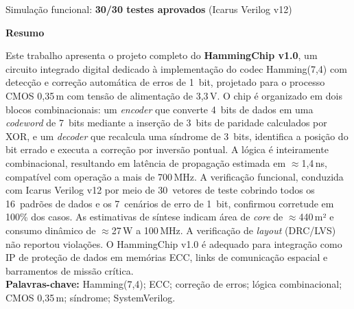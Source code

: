 \documentclass[12pt,a4paper]{article}
\begin{document}
\begin{center}

  \vfill
  {\small\textcolor{hamminggray}{Simulação funcional: \textbf{30/30 testes aprovados} (Icarus Verilog v12)}}
\end{center}

\newpage

\begin{center}
  {\large\bfseries\color{hammingblue} Resumo}
\end{center}
\begin{unidadebox}[Resumo]
Este trabalho apresenta o projeto completo do \textbf{HammingChip v1.0}, um circuito integrado digital dedicado à implementação do codec Hamming(7,4) com detecção e correção automática de erros de 1~bit, projetado para o processo CMOS 0,35\,\textmu m com tensão de alimentação de 3,3\,V. O chip é organizado em dois blocos combinacionais: um \textit{encoder} que converte 4~bits de dados em uma \textit{codeword} de 7~bits mediante a inserção de 3~bits de paridade calculados por XOR, e um \textit{decoder} que recalcula uma síndrome de 3~bits, identifica a posição do bit errado e executa a correção por inversão pontual. A lógica é inteiramente combinacional, resultando em latência de propagação estimada em $\approx$1,4\,ns, compatível com operação a mais de 700\,MHz. A verificação funcional, conduzida com Icarus Verilog v12 por meio de 30~vetores de teste cobrindo todos os 16~padrões de dados e os 7~cenários de erro de 1~bit, confirmou corretude em 100\% dos casos. As estimativas de síntese indicam área de \textit{core} de $\approx$440\,\textmu m² e consumo dinâmico de $\approx$27\,\textmu W a 100\,MHz. A verificação de \textit{layout} (DRC/LVS) não reportou violações. O HammingChip v1.0 é adequado para integração como IP de proteção de dados em memórias ECC, links de comunicação espacial e barramentos de missão crítica.\\[4pt]
\textbf{Palavras-chave:} Hamming(7,4); ECC; correção de erros; lógica combinacional; CMOS 0,35\,\textmu m; síndrome; SystemVerilog.
\end{unidadebox}
\end{document}
